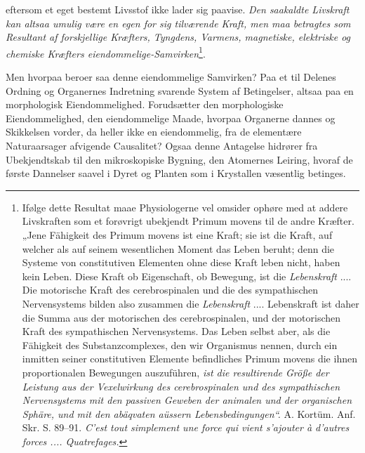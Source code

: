 \documentclass[12pt,a4paper]{book}
\begin{document}
eftersom et eget bestemt Livsstof ikke lader sig paavise. \emph{Den
saakaldte Livskraft kan altsaa umulig være en egen for sig tilværende
Kraft, men maa betragtes som Resultant af forskjellige Kræfters, Tyngdens,
Varmens, magnetiske, elektriske og chemiske Kræfters
eiendommelige-Samvirken}\footnote{Ifølge dette Resultat maae Physiologerne
vel omsider ophøre med at addere Livskraften som et forøvrigt ubekjendt
Primum movens til de andre Kræfter. „Jene Fähigkeit des Primum movens ist
eine Kraft; sie ist die Kraft, auf welcher als auf seinem wesentlichen
Moment das Leben beruht; denn die Systeme von constitutiven Elementen ohne
diese Kraft leben nicht, haben kein Leben. Diese Kraft ob Eigenschaft, ob
Bewegung, ist die \emph{Lebenskraft} .... Die motorische Kraft des
cerebrospinalen und die des sympathischen Nervensystems bilden also
zusammen die \emph{Lebenskraft} .... Lebenskraft ist daher die Summa aus
der motorischen des cerebrospinalen, und der motorischen Kraft des
sympathischen Nervensystems. Das Leben selbst aber, als die Fähigkeit des
Substanzcomplexes, den wir Organismus nennen, durch ein inmitten seiner
constitutiven Elemente befindliches Primum movens die ihnen proportionalen
Bewegungen auszuführen, \emph{ist die resultirende Größe der Leistung aus der
Vexelwirkung des cerebrospinalen und des sympathischen Nervensystems mit
den passiven Geweben der animalen und der organischen Sphäre, und mit den
abäqvaten aüssern Lebensbedingungen“.} A. Kortüm. Anf. Skr. S. 89--91.
\textit{C'est tout simplement une force qui vient s'ajouter à d'autres
forces .... Quatrefages.}}.

Men hvorpaa beroer saa denne eiendommelige Samvirken? Paa et til Delenes
Ordning og Organernes Indretning svarende System af Betingelser, altsaa
paa en morphologisk Eiendommelighed. Forudsætter den morphologiske
Eiendommelighed, den eiendommelige Maade, hvorpaa Organerne dannes og
Skikkelsen vorder, da heller ikke en eiendommelig, fra de elementære
Naturaarsager afvigende Causalitet? Ogsaa denne Antagelse hidrører fra
Ubekjendtskab til den mikroskopiske Bygning, den Atomernes Leiring, hvoraf
de første Dannelser saavel i Dyret og Planten som i Krystallen væsentlig
betinges.
\end{document}
